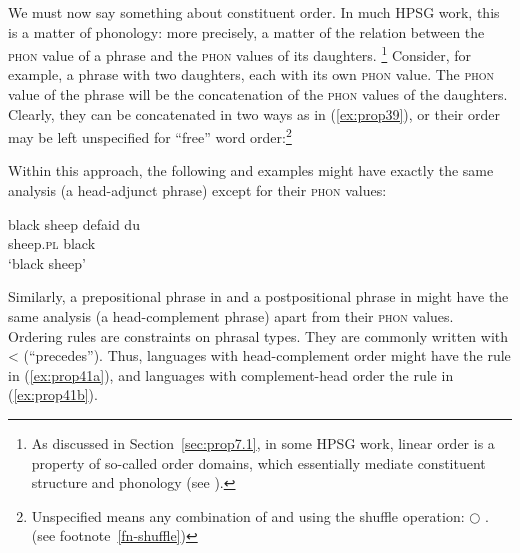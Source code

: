 \documentclass[output=paper
	        ,collection
	        ,collectionchapter
 	        ,biblatex
                ,babelshorthands
                ,newtxmath
                ,draftmode
                ,colorlinks, citecolor=brown
]{langscibook}
\begin{document}
We must now say something about constituent order. In much HPSG work, this is a matter of phonology:
more precisely, a matter of the relation between the \textsc{phon} value of a phrase and the
\textsc{phon} values of its daughters.%
%
\footnote{As discussed in Section~\ref{sec:prop7.1}, in some HPSG work, linear order is a property
  of so-called order domains, which essentially mediate constituent structure and phonology (see
  ). } 
%
Consider, for example, a phrase with two daughters, each with its own \textsc{phon} value. The
\textsc{phon} value of the phrase will be the concatenation of the \textsc{phon} values of the
daughters. Clearly, they can be concatenated in two ways as in (\ref{ex:prop39}),
or their order may be left unspecified for ``free'' word order:\footnote{
Unspecified means any combination of  and  using the shuffle operation: 
$\bigcirc$ . (see footnote~\ref{fn-shuffle})
}

\eal
\label{ex:prop39}\label{ex-phon-concatenation}
\ex
{}
\ex
{}
\zl

\noindent
Within this approach, the following  and  examples might have exactly the same analysis (a head-adjunct phrase) except for their \textsc{phon} values:

\eal\label{ex:prop40}
\ex\label{ex:prop40a}
black sheep
\ex\label{ex:prop40b}
\gll defaid            du\\
     sheep.\textsc{pl} black\\
\glt `black sheep'
\zl

\noindent
Similarly, a prepositional phrase in  and a postpositional phrase in  might have the same analysis (a head-complement phrase) apart from their \textsc{phon} values. Ordering rules are constraints on phrasal types. They are commonly written with < (``precedes''). Thus, languages with head-complement order might have the rule in (\ref{ex:prop41a}), and languages with complement-head order the rule in (\ref{ex:prop41b}).
\end{document}

